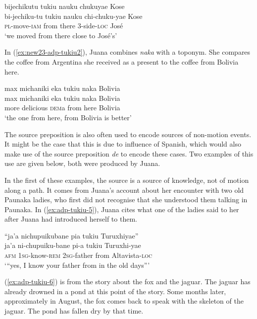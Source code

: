 \ea\label{ex:adp-tukiu-4}
\begingl
\glpreamble bijechikutu tukiu nauku chukuyae Kose\\
\gla bi-jechiku-tu tukiu nauku chi-chuku-yae Kose\\
\textsc{pl}-move-\textsc{iam} from there 3-side-\textsc{loc} José\\
\glft ‘we moved from there close to José’s’
\endgl
\trailingcitation{[rxx-p181101l-2.257]}
\xe

In (\ref{ex:new23-adp-tukiu2}), Juana combines \textit{naka} with a toponym. She compares the coffee from Argentina she received as a present to the coffee from Bolivia here.

\ea\label{ex:new23-adp-tukiu2}
\begingl
\glpreamble max michaniki eka tukiu naka Bolivia\\
\gla max michaniki eka tukiu naka Bolivia\\
\glb more delicious \textsc{dem}a from here Bolivia\\
\glft ‘the one from here, from Bolivia is better’
\endgl
\trailingcitation{[jxx-e120430l-4.37]}
\xe

The source preposition is also often used to encode sources of non-motion events. It might be the case that this is due to influence of Spanish, which would also make use of the source preposition \textit{de} to encode these cases. Two examples of this use are given below, both were produced by Juana.

In the first of these examples, the source is a source of knowledge, not of motion along a path. It comes from Juana’s account about her encounter with two old Paunaka ladies, who first did not recognise that she understood them talking in Paunaka. In (\ref{ex:adp-tukiu-5}), Juana cites what one of the ladies said to her after Juana had introduced herself to them.

\ea\label{ex:adp-tukiu-5}
\begingl
\glpreamble “ja'a nichupuikubane pia tukiu Turuxhiyae”\\
\gla ja'a ni-chupuiku-bane pi-a tukiu Turuxhi-yae\\
\glb \textsc{afm} 1\textsc{sg}-know-\textsc{rem} 2\textsc{sg}-father from Altavista-\textsc{loc} \\
\glft ‘“yes, I know your father from  in the old days”’
\endgl
\trailingcitation{[jxx-p120515l-1.134]}
\xe

(\ref{ex:adp-tukiu-6}) is from the story about the fox and the jaguar. The jaguar has already drowned in a pond at this point of the story. Some months later, approximately in August, the fox comes back to speak with the skeleton of the jaguar. The pond has fallen dry by that time.

